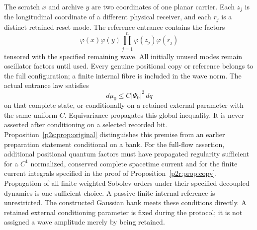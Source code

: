 \documentclass[11pt]{article}
\numberwithin{equation}{section}
\theoremstyle{definition}
\theoremstyle{remark}
\begin{document}
The scratch $x$ and archive $y$ are two coordinates of one planar
carrier. Each $z_j$ is the longitudinal coordinate of a different
physical receiver, and each $r_j$ is a distinct retained reset mode.
The reference entrance contains the factors
\begin{equation}\label{p2r:eq:bank}
 \varphi(x)\varphi(y)
       \prod_{j=1}^n\varphi(z_j)\varphi(r_j)
\end{equation}
tensored with the specified remaining wave. All initially unused
modes remain oscillator factors until used. Every genuine positional
copy or reference belongs to the full configuration; a finite internal
fibre is included in the wave norm. The actual entrance law satisfies
\begin{equation}\label{p2r:eq:cap}
 d\mu_0\leq C|\Psi_0|^2\,dq
\end{equation}
on that complete state, or conditionally on a retained external
parameter with the same uniform $C$. Equivariance propagates this
global inequality. It is never asserted after conditioning on a
selected recorded bit. Proposition~\ref{p2s:prop:original} distinguishes
this premise from an earlier preparation statement conditional on a bank.
For the full-flow assertion, additional positional quantum factors
must have propagated regularity sufficient for a $C^1$ normalized,
conserved complete spacetime current and for the finite current integrals
specified in the proof of Proposition~\ref{p2r:prop:copy}. Propagation
of all finite weighted Sobolev orders under their specified decoupled
dynamics is one sufficient choice. A passive finite internal reference
is unrestricted. The constructed Gaussian bank meets these conditions
directly. A retained external conditioning parameter is fixed during the
protocol; it is not assigned a wave amplitude merely by being retained.
\end{document}

